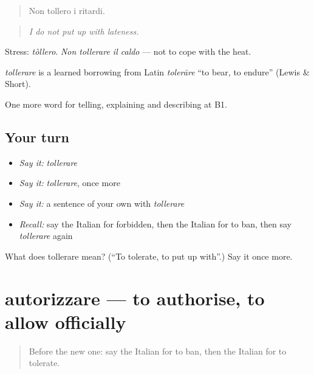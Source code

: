 \begin{quote}
Non tollero i ritardi.
\end{quote}

\begin{quote}
\emph{I do not put up with lateness.}
\end{quote}

Stress: \emph{tòllero}. \emph{Non tollerare il caldo} — not to cope with the heat.

\begin{cousinweb}
\emph{tollerare} is a learned borrowing from Latin \emph{tolerāre} \textquotedblleft{}to bear, to endure\textquotedblright{} (Lewis \& Short).
\end{cousinweb}

\begin{grammarlens}[title={What you've built}]
One more word for telling, explaining and describing at B1.
\end{grammarlens}

\subsection*{Your turn}
\begin{itemize}
\raggedright
  \item \emph{Say it:} \emph{tollerare}
  \item \emph{Say it:} \emph{tollerare}, once more
  \item \emph{Say it:} a sentence of your own with \emph{tollerare}
  \item \emph{Recall:} say the Italian for forbidden, then the Italian for to ban, then say \emph{tollerare} again
\end{itemize}

\begin{tcolorbox}[breakable,colback=teal!4,colframe=teal!35!black,title={Before you move on}]
What does tollerare mean? (\textquotedblleft{}To tolerate, to put up with\textquotedblright{}.) Say it once more.
\end{tcolorbox}
\section[autorizzare]{autorizzare — to authorise, to allow officially}

\label{lesson:IT-C385-autorizzare}



\begin{quote}
Before the new one: say the Italian for to ban, then the Italian for to tolerate.
\end{quote}

